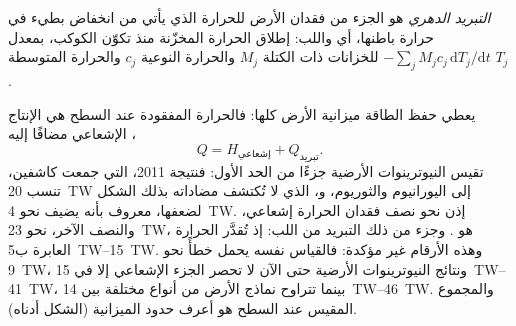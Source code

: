 \begin{definition}\label{def:b1:heat-budget:secular-cooling}
\emph{التبريد الدهري} هو الجزء من فقدان الأرض للحرارة الذي يأتي من انخفاض بطيء في حرارة باطنها، أي  واللب: إطلاق الحرارة المخزّنة منذ تكوّن الكوكب، بمعدل $-\sum_j M_j c_j\,\mathrm dT_j/\mathrm dt$ للخزانات ذات الكتلة $M_j$ والحرارة النوعية $c_j$ والحرارة المتوسطة $T_j$.
\end{definition}

يعطي حفظ الطاقة ميزانية الأرض كلها: فالحرارة المفقودة عند السطح هي الإنتاج الإشعاعي مضافًا إليه ،
\[
  Q = H_{\text{إشعاعي}} + Q_{\text{تبريد}} .
\]
تقيس النيوترينوات الأرضية جزءًا من الحد الأول: فنتيجة 2011، التي جمعت كاشفين، تنسب \qty{20}{TW} إلى اليورانيوم والثوريوم، و، الذي لا تُكتشف مضاداته بذلك الشكل لضعفها، معروف بأنه يضيف نحو \qty{4}{TW}.
إذن نحو نصف فقدان الحرارة إشعاعي، والنصف الآخر، نحو \qty{23}{TW}، هو . وجزء من ذلك التبريد من اللب: إذ تُقدَّر الحرارة العابرة  ب\qtyrange{5}{15}{TW}. وهذه الأرقام غير مؤكدة: فالقياس نفسه يحمل خطأً نحو \qty{9}{TW}، ونتائج النيوترينوات الأرضية حتى الآن لا تحصر الجزء الإشعاعي إلا في \qtyrange{15}{41}{TW}، بينما تتراوح نماذج الأرض من أنواع مختلفة بين \qtyrange{14}{46}{TW}. والمجموع المقيس عند السطح هو أعرف حدود الميزانية (الشكل أدناه).

